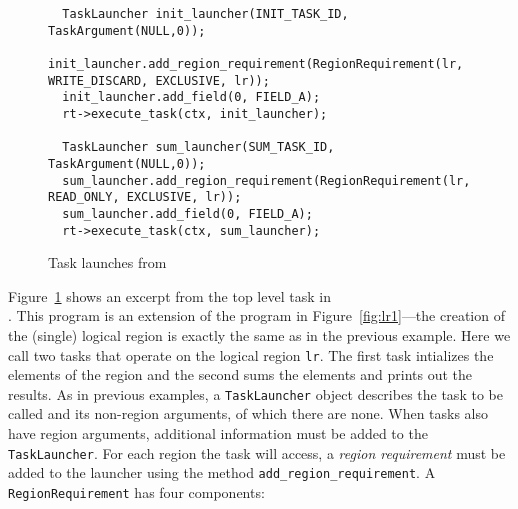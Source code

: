 \begin{figure}
{\small
\begin{lstlisting}
  TaskLauncher init_launcher(INIT_TASK_ID, TaskArgument(NULL,0));
  init_launcher.add_region_requirement(RegionRequirement(lr, WRITE_DISCARD, EXCLUSIVE, lr));
  init_launcher.add_field(0, FIELD_A);
  rt->execute_task(ctx, init_launcher);

  TaskLauncher sum_launcher(SUM_TASK_ID, TaskArgument(NULL,0));
  sum_launcher.add_region_requirement(RegionRequirement(lr, READ_ONLY, EXCLUSIVE, lr));
  sum_launcher.add_field(0, FIELD_A);
  rt->execute_task(ctx, sum_launcher);
\end{lstlisting}
}
\caption{Task launches from }
\label{fig:privileges}
\end{figure}


Figure~\ref{fig:privileges} shows an excerpt from the top level task in \\
.  This program is an extension of the
program in Figure~\ref{fig:lr1}---the creation of the (single) logical region is exactly the same as in the 
previous example.  Here we call two tasks that operate on the logical region {\tt lr}. The first
task intializes the elements of the region and the second sums the elements and prints out the results.
As in previous examples, a {\tt TaskLauncher} object describes the task to be called and its non-region arguments,
of which there are none.  When tasks also have region arguments, additional information must be added
to the {\tt TaskLauncher}.
For each region the task will access, a {\em region requirement} must be added to the launcher using the
method {\tt add\_region\_requirement}.  A {\tt RegionRequirement} has four components: 

